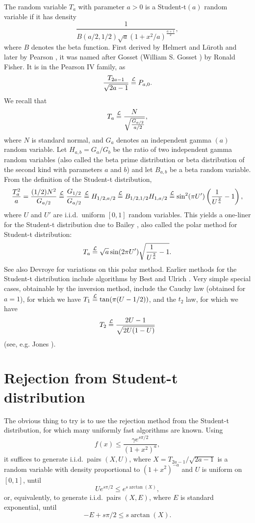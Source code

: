 \documentclass[12pt,reqno,tbtags]{amsart}
\newcommand{\inlaw}{\buildrel {\mathcal L} \over =}
\begin{document}
The random variable $T_a$ with parameter $a > 0$ is a Student-t$(a)$ random variable if it has density
$$
\frac{1 }{ B(a/2, 1/2) \sqrt{a} ( 1+x^2 /a)^{\frac{a+1}{ 2}} },
$$
where $B$ denotes the beta function. 
First derived by Helmert \cite{Hel2, Hel} and L\"uroth \cite{Lur} and later by Pearson \cite{Pea}, it was named after Gosset (William S. Gosset \cite{Stu}) by Ronald Fisher.
It is in the Pearson IV family, as 
$$
\frac{ T_{2a-1} }{ \sqrt{2a-1} }  \inlaw P_{a,0}.
$$
We recall that
$$
T_a \inlaw \frac{ N }{ \sqrt{\frac{G_{a/2}}{a/2} }},
$$
where $N$ is standard normal, and $G_a$ denotes an independent gamma $(a)$ random variable.
Let $H_{a,b} = G_a/G_b$ be the ratio of two independent gamma random
variables (also called the beta prime distribution or beta distribution of the second kind with parameters $a$ and $b$) and let $B_{a,b}$ be a beta random variable.
From the definition of the Student-t distribution,
$$
\frac{T_a^2 }{ a} = \frac{ (1/2) N^2 }{  G_{a/2} } \inlaw \frac{  G_{1/2} }{ G_{a/2} }
\inlaw  H_{1/2, a/2}
\inlaw  B_{1/2,1/2} H_{1, a/2}
\inlaw  \sin^2 (\pi U') \left( \frac{1 }{ U^{\frac{2 }{ a}} } - 1 \right),
$$
where $U$ and $U'$ are i.i.d.\ uniform $[0,1]$ random variables.
This yields a one-liner for the Student-t distribution 
due to Bailey \cite{Bai}, also called the polar method for Student-t distribution:
\begin{align}\label{student}
T_a \inlaw \sqrt{a}\sin (2 \pi U') \sqrt{ \frac{1 }{ U^{\frac{2}{a}} } - 1 }.
\end{align}
See also Devroye \cite{D1} for variations on this polar method.
Earlier methods for the Student-t distribution include algorithms by Best \cite{Best}
and Ulrich \cite{U}.
Very simple special cases, obtainable by the inversion method, include the Cauchy law (obtained for $a=1$), for which we have $T_1 \inlaw \tan(\pi (U-1/2))$, and the $t_2$ law, for which we have
$$
T_2 \inlaw \frac{2U-1}{\sqrt{2U(1-U)}}
$$
(see, e.g. Jones \cite{LL}).

\section{Rejection from Student-t distribution}\label{rejection}


The obvious thing to try is to use the rejection method from the Student-t distribution,
for which many uniformly fast algorithms are known.
Using
$$
f(x) \le \frac{\gamma e^{s\pi/2}}{(1+x^2)^a},
$$
it suffices to generate i.i.d.\ pairs $(X,U)$, where $X = T_{2 a -1} / \sqrt{2a-1}$ is a random variable with
density proportional to $(1+x^2)^{-a}$ and $U$ is uniform on $[0,1]$,
until 
$$
U e^{s \pi/2} \le e^{s \arctan (X)},
$$
or, equivalently, to generate i.i.d.\ pairs $(X,E)$, where $E$ is standard
exponential, until 
$$
-E + s \pi/2 \le s \arctan (X).
$$
\end{document}
